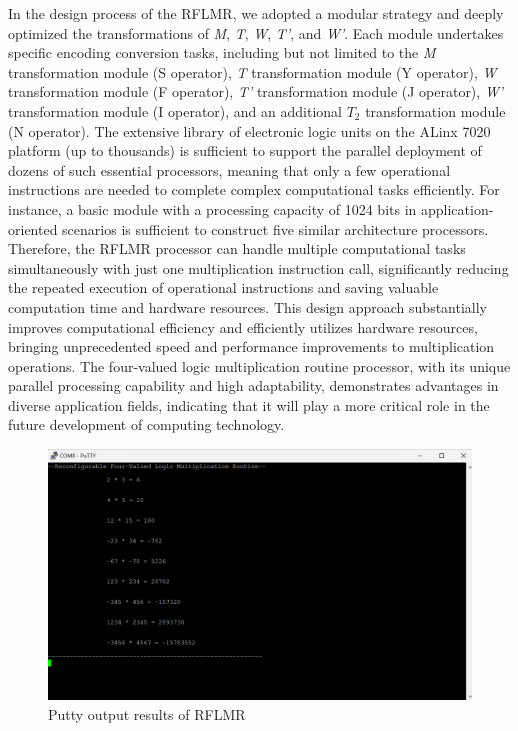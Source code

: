 \documentclass[electronics,article,accept,pdftex,moreauthors]{Definitions/mdpi}
\begin{document}
In the design process of the RFLMR, we adopted a modular strategy and deeply optimized the transformations of \textit{M}, \textit{T}, \textit{W}, \textit{T’}, and \textit{W’}. Each module undertakes specific encoding conversion tasks, including but not limited to the \textit{M} transformation module (S operator), \textit{T} transformation module (Y operator), \textit{W} transformation module (F operator), \textit{T’} transformation module (J operator), \textit{W’} transformation module (I operator), and an additional $T_2$ transformation module (N operator). The extensive library of electronic logic units on the ALinx 7020 platform (up to thousands) is sufficient to support the parallel deployment of dozens of such essential processors, meaning that only a few operational instructions are needed to complete complex computational tasks efficiently. For instance, a basic module with a processing capacity of 1024 bits in application-oriented scenarios is sufficient to construct five similar architecture processors. Therefore, the RFLMR processor can handle multiple computational tasks simultaneously with just one multiplication instruction call, significantly reducing the repeated execution of operational instructions and saving valuable computation time and hardware resources. This design approach substantially improves computational efficiency and efficiently utilizes hardware resources, bringing unprecedented speed and performance improvements to multiplication operations. The four-valued logic multiplication routine processor, with its unique parallel processing capability and high adaptability, demonstrates advantages in diverse application fields, indicating that it will play a more critical role in the future development of computing technology.
\begin{figure}[H]
    \includegraphics[scale=0.4]{./images/9.png}
    \caption{Putty output results of RFLMR}
    \label{fig8}
\end{figure}
\end{document}
